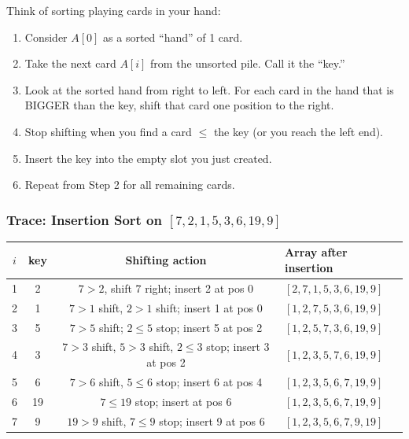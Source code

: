 \documentclass[12pt,portrait]{article}
\begin{document}
\begin{rulebox}
Think of sorting playing cards in your hand:
\begin{enumerate}[leftmargin=*]
    \item Consider $A[0]$ as a sorted ``hand'' of 1 card.
    \item Take the next card $A[i]$ from the unsorted pile. Call it the ``key.''
    \item Look at the sorted hand from right to left. For each card in the hand that is BIGGER than the key, shift that card one position to the right.
    \item Stop shifting when you find a card $\leq$ the key (or you reach the left end).
    \item Insert the key into the empty slot you just created.
    \item Repeat from Step 2 for all remaining cards.
\end{enumerate}
\end{rulebox}

\subsubsection{Trace: Insertion Sort on $[7,2,1,5,3,6,19,9]$}

\begin{center}
\begin{tabular}{c|c|c|l}
\toprule
\textbf{$i$} & \textbf{key} & \textbf{Shifting action} & \textbf{Array after insertion} \\
\midrule
1 & 2 & $7>2$, shift 7 right; insert 2 at pos 0 & $[2,7,1,5,3,6,19,9]$ \\
2 & 1 & $7>1$ shift, $2>1$ shift; insert 1 at pos 0 & $[1,2,7,5,3,6,19,9]$ \\
3 & 5 & $7>5$ shift; $2\leq5$ stop; insert 5 at pos 2 & $[1,2,5,7,3,6,19,9]$ \\
4 & 3 & $7>3$ shift, $5>3$ shift, $2\leq3$ stop; insert 3 at pos 2 & $[1,2,3,5,7,6,19,9]$ \\
5 & 6 & $7>6$ shift, $5\leq6$ stop; insert 6 at pos 4 & $[1,2,3,5,6,7,19,9]$ \\
6 & 19 & $7\leq19$ stop; insert at pos 6 & $[1,2,3,5,6,7,19,9]$ \\
7 & 9 & $19>9$ shift, $7\leq9$ stop; insert 9 at pos 6 & $[1,2,3,5,6,7,9,19]$ \\
\bottomrule
\end{tabular}
\end{center}
\end{document}

